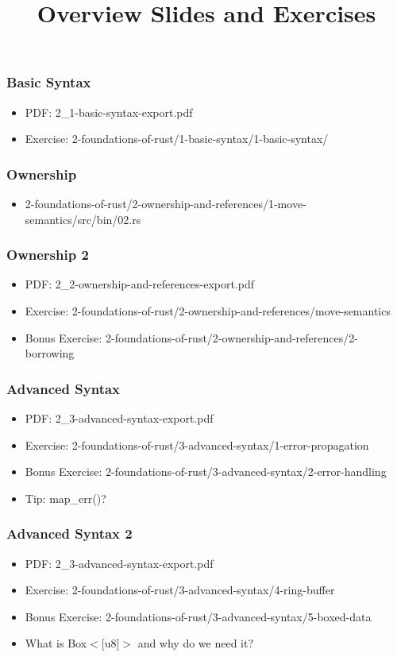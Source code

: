 \documentclass[utf8,aspectratio=169]{beamer}
\title{Overview Slides and Exercises}
\begin{document}
\begin{frame}
	\frametitle{Basic Syntax}
	\begin{itemize}
		\item PDF: 2\_1-basic-syntax-export.pdf
		\item Exercise: 2-foundations-of-rust/1-basic-syntax/1-basic-syntax/
	\end{itemize}
\end{frame}

\begin{frame}
	\frametitle{Ownership}
	\begin{itemize}
		\item 2-foundations-of-rust/2-ownership-and-references/1-move-semantics/src/bin/02.rs
	\end{itemize}
\end{frame}

\begin{frame}
	\frametitle{Ownership 2}
	\begin{itemize}
		\item PDF: 2\_2-ownership-and-references-export.pdf
		\item Exercise: 2-foundations-of-rust/2-ownership-and-references/move-semantics
		\item Bonus Exercise: 2-foundations-of-rust/2-ownership-and-references/2-borrowing
	\end{itemize}
\end{frame}

\begin{frame}
	\frametitle{Advanced Syntax}
	\begin{itemize}
		\item PDF: 2\_3-advanced-syntax-export.pdf
		\item Exercise: 2-foundations-of-rust/3-advanced-syntax/1-error-propagation
		\item Bonus Exercise: 2-foundations-of-rust/3-advanced-syntax/2-error-handling
		\item Tip: map\_err()?
	\end{itemize}
\end{frame}

\begin{frame}
	\frametitle{Advanced Syntax 2}
	\begin{itemize}
		\item PDF: 2\_3-advanced-syntax-export.pdf
		\item Exercise: 2-foundations-of-rust/3-advanced-syntax/4-ring-buffer
		\item Bonus Exercise: 2-foundations-of-rust/3-advanced-syntax/5-boxed-data
		\item What is Box$\mathrm{<}$[u8]$\mathrm{>}$ and why do we need it?
	\end{itemize}
\end{frame}
\end{document}
